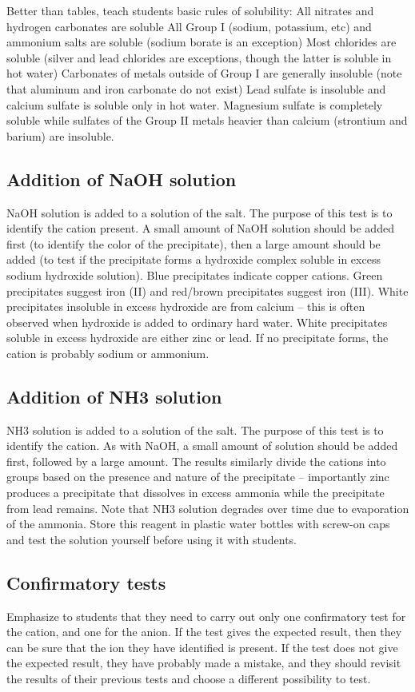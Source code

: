 Better than tables, 
teach students basic rules of solubility:
All nitrates and hydrogen carbonates are soluble
All Group I (sodium, 
potassium, 
etc) and ammonium salts are soluble (sodium borate is an exception)
Most chlorides are soluble (silver and lead chlorides are exceptions, 
though the latter is soluble in hot water)
Carbonates of metals outside of Group I are generally insoluble 
(note that aluminum and iron carbonate do not exist)
Lead sulfate is insoluble and calcium sulfate is soluble only in hot water. 
Magnesium sulfate is completely soluble 
while sulfates of the Group II metals heavier than calcium 
(strontium and barium) are insoluble.

\subsection{Addition of NaOH solution}
NaOH solution is added to a solution of the salt. 
The purpose of this test is to identify the cation present. 
A small amount of NaOH solution should be added first 
(to identify the color of the precipitate), 
then a large amount should be added (to test if the precipitate 
forms a hydroxide complex soluble in excess sodium hydroxide solution). 
Blue precipitates indicate copper cations. 
Green precipitates suggest iron (II) 
and red/brown precipitates suggest iron (III). 
White precipitates insoluble in excess hydroxide are from calcium – 
this is often observed when hydroxide is added to ordinary hard water. 
White precipitates soluble in excess hydroxide are either zinc or lead. 
If no precipitate forms, 
the cation is probably sodium or ammonium.

\subsection{Addition of NH3 solution}
NH3 solution is added to a solution of the salt. 
The purpose of this test is to identify the cation. 
As with NaOH, 
a small amount of solution should be added first, 
followed by a large amount. 
The results similarly divide the cations into groups 
based on the presence and nature of the precipitate – 
importantly zinc produces a precipitate that dissolves in excess ammonia 
while the precipitate from lead remains. 
Note that NH3 solution degrades over time 
due to evaporation of the ammonia. 
Store this reagent in plastic water bottles with screw-on caps 
and test the solution yourself before using it with students.

\subsection{Confirmatory tests}
Emphasize to students that they need to carry out 
only one confirmatory test for the cation, 
and one for the anion. 
If the test gives the expected result, 
then they can be sure that the ion they have identified is present. 
If the test does not give the expected result, 
they have probably made a mistake, 
and they should revisit the results of their previous tests 
and choose a different possibility to test.

